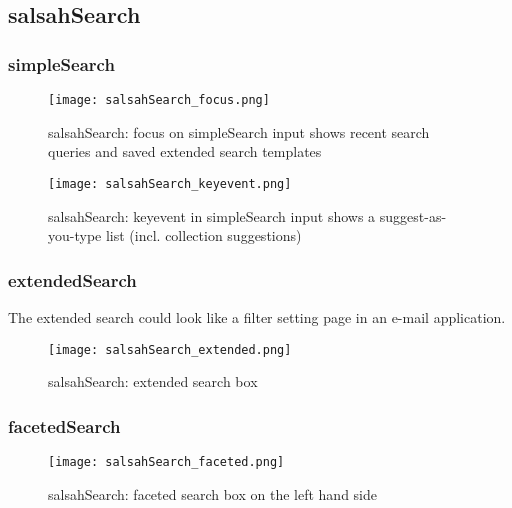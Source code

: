 \newpage

\subsection{salsahSearch}
\subsubsection{simpleSearch}
\begin{figure}[!h]
    \centering
    \texttt{[image: salsahSearch\_focus.png]}
    \caption{salsahSearch: focus on simpleSearch input shows recent search queries and saved extended search templates}
\end{figure}
\begin{figure}[!h]
    \centering
    \texttt{[image: salsahSearch\_keyevent.png]}
    \caption{salsahSearch: keyevent in simpleSearch input shows a suggest-as-you-type list (incl. collection suggestions)}
\end{figure}

\newpage
\subsubsection{extendedSearch}
The extended search could look like a filter setting page in an e-mail application.

\begin{figure}[!h]
    \centering
    \texttt{[image: salsahSearch\_extended.png]}
    \caption{salsahSearch: extended search box}
\end{figure}

\newpage
\subsubsection{facetedSearch}
\begin{figure}[!h]
    \centering
    \texttt{[image: salsahSearch\_faceted.png]}
    \caption{salsahSearch: faceted search box on the left hand side}
\end{figure}